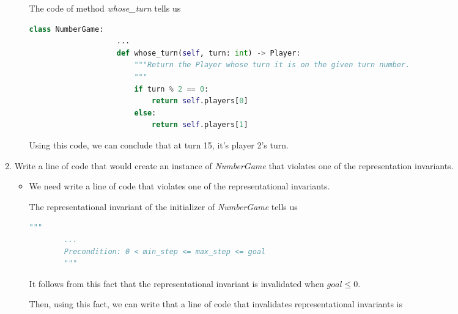 \documentclass[12pt]{article}
\begin{document}
\begin{enumerate}[1.]
\begin{itemize}
\begin{mdframed}
\begin{mdframed}
                \bigskip

                The code of method \textit{whose\_turn} tells us

                \bigskip

                \begin{lstlisting}[language=Python]
                class NumberGame:
                    ...
                    def whose_turn(self, turn: int) -> Player:
                        """Return the Player whose turn it is on the given turn number.
                        """
                        if turn % 2 == 0:
                            return self.players[0]
                        else:
                            return self.players[1]
                \end{lstlisting}

                \bigskip

                Using this code, we can conclude that at turn 15, it's player 2's turn.
            \end{mdframed}
        \end{mdframed}
    \end{itemize}

    \item Write a line of code that would create an instance of \textit{NumberGame}
    that violates one of the representation invariants.

    \begin{itemize}
        \item

        We need write a line of code that violates one of the representational
        invariants.

        \bigskip

        The representational invariant of the initializer of
        \textit{NumberGame} tells us

        \bigskip

        \begin{lstlisting}[language=Python]
        """
        ...
        Precondition: 0 < min_step <= max_step <= goal
        """
        \end{lstlisting}

        \bigskip

        It follows from this fact that the representational invariant is
        invalidated when $goal \leq 0$.

        \bigskip

        Then, using this fact, we can write that a line of code that
        invalidates representational invariants is


\end{itemize}
\end{enumerate}
\end{document}
